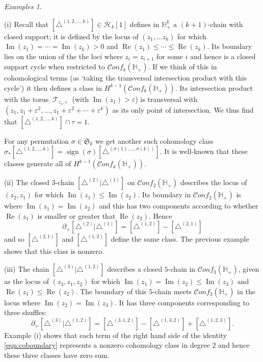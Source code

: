 \documentclass[12pt,letterpaper]{amsart}
\numberwithin{equation}{section}
\def\HH{{\mathbb H}}
\def\tri{\triangle}
\newcommand{\p}{\partial}
\def\Hcal{{\mathcal H}}
\def\Sfrak{\mathfrak{S}}
\newcommand\conf{\mathscr{C}\!\mathit{onf}\!}
\newcommand\im{\operatorname{Im}}
\newcommand\re{\operatorname{Re}}
\newcommand\sign{\operatorname{sign}}
\newcommand\Tcal{\operatorname{{\mathcal T}}}
\theoremstyle{remark}
\newtheorem{examples}[theorem]{Examples}
\begin{document}
\begin{examples}\label{examples:basic}

 (i)  Recall that  $[\tri^{(1,2,\dots, k)}]\in \Hcal_k[1]$  defines  in $\HH_+^k$  a $(k+1)$-chain with closed support; it is defined by   the locus   of $(z_1,\dots z_k)$ for which $\im(z_1)=\cdots= \im(z_k)>0$ and 
$\re (z_1)\le\cdots\le  \re(z_k)$. Its  boundary lies on the union of the the loci where $z_i=z_{i+1}$ for some $i$ and hence  is  a closed support cycle when restricted to $\conf_k(\HH_+)$. If we  think of this in cohomological terms (as `taking the transversal intersection product with this cycle') it then  defines a class in $H^{k-1}(\conf_k(\HH_+))$. Its intersection product with the torus $\Tcal_{z_1,\varepsilon}$ 
(with $\im (z_1)>\varepsilon$)  is transversal with 
 $(z_1, z_1+\varepsilon^2,\dots, z_1+\varepsilon^2+\cdots +\varepsilon^k)$  as its only point of intersection.
We thus  find that $[\tri^{(1,2,\dots, k)}]\cap \tau=1$.
 
 For any  permutation $\sigma\in \Sfrak_k$ we get another such  cohomology class
 $\sigma_*[\tri^{(1,2,\dots, k)}]=\sign(\sigma)[\tri^{(\sigma(1), \dots , \sigma(k))}]$.   It is well-known that these classes generate all of $H^{k-1}(\conf_k(\HH_+))$.

(ii)  The closed 3-chain  $[\tri^{(2)}|\tri^{(1)}]$ on $\conf_2(\HH_+)$ describes  the locus   of 
$(z_2,z_1)$ for which $\im(z_1)\le  \im(z_2)$. Its boundary in $\conf_2(\HH_+)$ is where 
$\im (z_1)=\im (z_2)$  and this has  two components according to whether  $\re(z_1)$ is smaller or greater that $\re(z_2)$. Hence
\[
\p_+[\tri^{(2)}|\tri^{(1)}]=[\tri^{(1,2)}]- [\tri^{(2,1)}]
\]
and so $[\tri^{(2,1)}]$ and $ [\tri^{(1,2)}]$ define the same class. The previous example shows that this class is nonzero.

(iii)  The chain $[\tri^{(3)}|\tri^{(1,2)}]$ describes a closed $5$-chain in $\conf_3(\HH_+)$, given as  the locus   of 
$(z_3,z_1, z_2)$ for which $\im(z_1)=\im (z_2)\le  \im(z_3)$ and  $\re(z_1)\le \re (z_2)$. The boundary of this $5$-chain meets  $\conf_3(\HH_+)$ in the locus  where 
$\im (z_2)=\im (z_3)$. It has three components corresponding to three shuffles: 
\begin{equation}\label{eqn:coboundary}
\p_+[\tri^{(3)}|\tri^{(1,2)}]=[\tri^{(3,1,2)}] -[\tri^{(1,3,2)}]+[\tri^{(1,2,3)}].
\end{equation}
Example (i) shows that  each term of the  right hand side of the identity \eqref{eqn:coboundary} represents a nonzero cohomology class in degree $2$ and hence  these three classes have zero sum. 
\end{examples}
\end{document}
